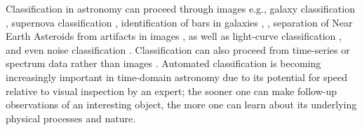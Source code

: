Classification in astronomy can proceed through images e.g., galaxy classification \citep{hoyle_measuring_2016}, supernova classification \citep{cabrera-vives_deep-hits:_2017}, identification of bars in galaxies \citep{abraham_detection_2018}, \citep[weak lensing estimation\footnote{\url{http://great3challenge.info/}}]{mandelbaum_third_2014}, separation of Near Earth Asteroids from artifacts in images \citep{morii_machine-learning_2016}, as well as light-curve classification \citep{morii_machine-learning_2016, mahabal_deep-learnt_2017, zevin_gravity_2017}, and even noise classification \citep{zevin_gravity_2017, george_classification_2018}. Classification can also proceed from time-series or spectrum data rather than images \citep[e.g.]{richards_construction_2012,newling_statistical_2011,armstrong_k2_2016,moller_photometric_2016,2015ApJS..219...39R, 2013MNRAS.430..509I}. Automated classification \citep{djorgovski_towards_2011, djorgovski_flashes_2012, narayan_machine_2018, bloom_automating_2012} is becoming increasingly important in time-domain astronomy due to its potential for speed relative to visual inspection by an expert; the sooner one can make follow-up observations of an interesting object, the more one can learn about its underlying physical processes and nature.
